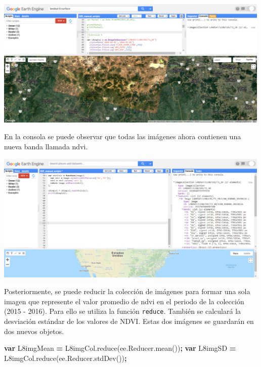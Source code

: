 \documentclass[
]{article}
\newenvironment{Shaded}{\begin{snugshade}}{\end{snugshade}}
\newcommand{\AttributeTok}[1]{\textcolor[rgb]{0.77,0.63,0.00}{#1}}
\newcommand{\KeywordTok}[1]{\textcolor[rgb]{0.13,0.29,0.53}{\textbf{#1}}}
\newcommand{\NormalTok}[1]{#1}
\newcommand{\OperatorTok}[1]{\textcolor[rgb]{0.81,0.36,0.00}{\textbf{#1}}}
\newcommand{\VariableTok}[1]{\textcolor[rgb]{0.00,0.00,0.00}{#1}}
\begin{document}
\includegraphics[width=500px]{Img/imSinNubes}

En la consola se puede observar que todas las imágenes ahora contienen
una nueva banda llamada ndvi.

\includegraphics[width=500px]{Img/imConNDVI}

Posteriormente, se puede reducir la colección de imágenes para formar
una sola imagen que represente el valor promedio de ndvi en el periodo
de la colección (2015 - 2016). Para ello se utiliza la función
\texttt{reduce}. También se calculará la desviación estándar de los
valores de NDVI. Estas dos imágenes se guardarán en dos nuevos objetos.

\begin{Shaded}
\begin{Highlighting}[]
\KeywordTok{var}\NormalTok{ L8imgMean }\OperatorTok{=} \VariableTok{L8imgCol}\NormalTok{.}\AttributeTok{reduce}\NormalTok{(}\VariableTok{ee}\NormalTok{.}\VariableTok{Reducer}\NormalTok{.}\AttributeTok{mean}\NormalTok{())}\OperatorTok{;}
\KeywordTok{var}\NormalTok{ L8imgSD }\OperatorTok{=} \VariableTok{L8imgCol}\NormalTok{.}\AttributeTok{reduce}\NormalTok{(}\VariableTok{ee}\NormalTok{.}\VariableTok{Reducer}\NormalTok{.}\AttributeTok{stdDev}\NormalTok{())}\OperatorTok{;}
\end{Highlighting}
\end{Shaded}
\end{document}
